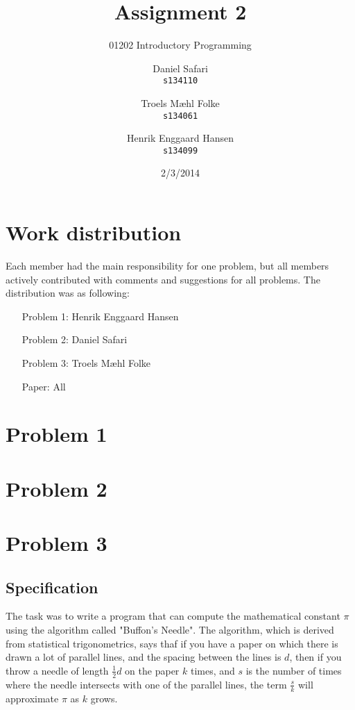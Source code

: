 \documentclass{scrartcl}
\begin{document}

\title{Assignment 2}
\subtitle{01202 Introductory Programming}
\author{
  Daniel Safari\\
  \texttt{s134110}
  \and
  Troels Mæhl Folke\\
  \texttt{s134061}
   \and
  Henrik Enggaard Hansen\\
  \texttt{s134099}
}
\date{2/3/2014}
\maketitle
\thispagestyle{empty}
\setcounter{page}{0}
\null
\vfill
\section*{Work distribution}

Each member had the main responsibility for one problem, but all members
actively contributed with comments and suggestions for all problems. The
distribution was as following:
\begin{itemize}
\setlength{\itemindent}{3em}
\item[Problem 1:] Henrik Enggaard Hansen
\item[Problem 2:] Daniel Safari
\item[Problem 3:] Troels Mæhl Folke
\item[Paper:]  All
\end{itemize}
\newpage
\section*{Problem 1}



\section*{Problem 2}



\section*{Problem 3}
\subsection*{Specification}
The task was to write a program that can compute the mathematical 
constant $\pi$ using the algorithm called "Buffon's Needle".
The algorithm, which is derived from statistical trigonometrics, says
thaf if you have a paper on which there is drawn a lot of parallel
lines, and the spacing between the lines is $d$, then if you throw
a needle of length $\frac{1}{2}d$ on the paper $k$ times, and $s$
is the number of times where the needle intersects with one
of the parallel lines, the term $\frac{s}{k}$ will approximate $\pi$  
as $k$ grows.
\end{document}
